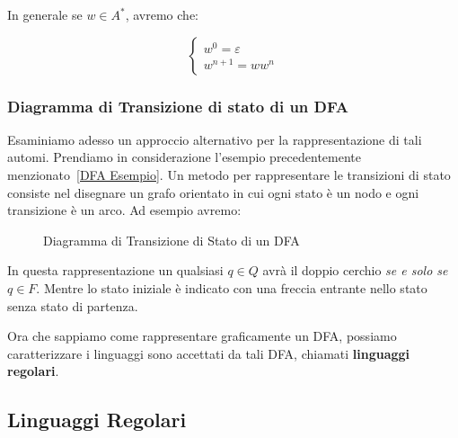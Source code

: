 In generale se \(w\in A^*\), avremo che:

\begin{equation}
  \begin{cases}
    w^0=\varepsilon\\
     w^{n+1}=ww^n
  \end{cases}
\end{equation}
\subsubsection{Diagramma di Transizione di stato di un DFA}

Esaminiamo adesso un approccio alternativo per la rappresentazione di tali automi. Prendiamo in considerazione l'esempio precedentemente menzionato~\ref{DFA Esempio}. Un metodo per rappresentare le transizioni di stato consiste nel disegnare un grafo orientato in cui ogni stato è un nodo e ogni transizione è un arco.
Ad esempio avremo:

\begin{figure}[ht]
  \centering
  \caption{Diagramma di Transizione di Stato di un DFA}
\end{figure}


In questa rappresentazione un qualsiasi \(q \in Q \) avrà il doppio cerchio   \textit{se e solo se} \(q \in F\). Mentre lo stato iniziale è indicato con una freccia entrante nello stato senza stato di partenza.

Ora che sappiamo come rappresentare graficamente un DFA, possiamo caratterizzare i linguaggi sono accettati da tali DFA, chiamati \textbf{linguaggi regolari}.

\subsection{Linguaggi Regolari}

